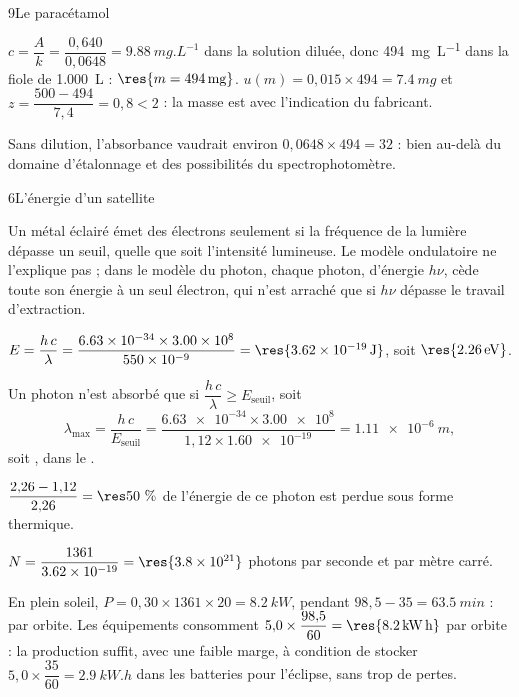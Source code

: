 \begin{corrigeBac}{9}{Le paracétamol}
\begin{questions}[resume]
\item $c=\dfrac{A}{k}=\dfrac{0{,}640}{0{,}0648}=\qty{9,88}{mg.L^{-1}}$ dans la solution diluée, donc \qty{494}{mg.L^{-1}} dans la fiole de \qty{1,000}{L} :
$\res{m=\qty{494}{mg}}$. $u(m)=0{,}015\times494=\qty{7,4}{mg}$ et $z=\dfrac{500-494}{7{,}4}=0{,}8<2$ : la masse est 
avec l'indication du fabricant. 
\item Sans dilution, l'absorbance vaudrait environ $0{,}0648\times494=32$ : bien au-delà du domaine d'étalonnage et des
possibilités du spectrophotomètre. 
\end{questions}
\end{corrigeBac}

\begin{corrigeBac}{6}{L'énergie d'un satellite}
\begin{questions}
\item Un métal éclairé émet des électrons seulement si la fréquence de la lumière dépasse un seuil, quelle que soit
l'intensité lumineuse. Le modèle ondulatoire ne l'explique pas ; dans le modèle du photon, chaque photon, d'énergie $h\nu$,
cède toute son énergie à un seul électron, qui n'est arraché que si $h\nu$ dépasse le travail d'extraction. \pts{1 pt}
\item $E=\dfrac{h\,c}{\lambda}=\dfrac{\num{6.63e-34}\times\num{3.00e8}}{\num{550e-9}}=\res{\qty{3,62e-19}{J}}$, soit $\res{\qty{2,26}{eV}}$. 
\item Un photon n'est absorbé que si $\dfrac{h\,c}{\lambda}\geqslant E_\mathrm{seuil}$, soit
\[\lambda_\mathrm{max}=\frac{h\,c}{E_\mathrm{seuil}}=\frac{\num{6.63e-34}\times\num{3.00e8}}{1{,}12\times\num{1.60e-19}}=\qty{1,11e-6}{m},\]
soit , dans le . \pts{1 pt}
\item $\dfrac{2{,}26-1{,}12}{2{,}26}=\res{50~\%}$ de l'énergie de ce photon est perdue sous forme thermique. 
\item $N=\dfrac{1361}{\num{3.62e-19}}=\res{\num{3.8e21}}$ photons par seconde et par mètre carré. 
\item En plein soleil, $P=0{,}30\times1361\times20=\qty{8,2}{kW}$, pendant $98{,}5-35=\qty{63,5}{min}$ :  par orbite. Les
équipements consomment $5{,}0\times\dfrac{98{,}5}{60}=\res{\qty{8,2}{kW.h}}$ par orbite : la production suffit, avec une faible marge, à
condition de stocker $5{,}0\times\dfrac{35}{60}=\qty{2,9}{kW.h}$ dans les batteries pour l'éclipse, sans trop de pertes. 
\end{questions}
\end{corrigeBac}

